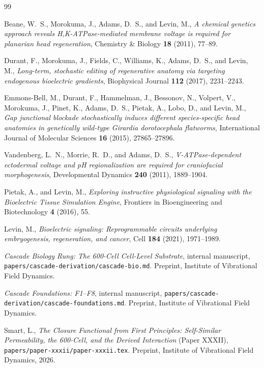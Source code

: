 \documentclass[12pt]{article}
\begin{document}
\begin{thebibliography}{99}

Beane, W.~S., Morokuma, J., Adams, D.~S., and Levin, M.,
\emph{A chemical genetics approach reveals H,K-ATPase-mediated
membrane voltage is required for planarian head regeneration},
Chemistry \& Biology \textbf{18} (2011), 77--89.

Durant, F., Morokuma, J., Fields, C., Williams, K., Adams, D.~S.,
and Levin, M.,
\emph{Long-term, stochastic editing of regenerative anatomy via
targeting endogenous bioelectric gradients},
Biophysical Journal \textbf{112} (2017), 2231--2243.

Emmons-Bell, M., Durant, F., Hammelman, J., Bessonov, N.,
Volpert, V., Morokuma, J., Pinet, K., Adams, D.~S., Pietak, A.,
Lobo, D., and Levin, M.,
\emph{Gap junctional blockade stochastically induces different
species-specific head anatomies in genetically wild-type
Girardia dorotocephala flatworms},
International Journal of Molecular Sciences \textbf{16} (2015),
27865--27896.

Vandenberg, L.~N., Morrie, R.~D., and Adams, D.~S.,
\emph{V-ATPase-dependent ectodermal voltage and pH regionalization
are required for craniofacial morphogenesis},
Developmental Dynamics \textbf{240} (2011), 1889--1904.

Pietak, A., and Levin, M.,
\emph{Exploring instructive physiological signaling with the
Bioelectric Tissue Simulation Engine},
Frontiers in Bioengineering and Biotechnology \textbf{4} (2016), 55.

Levin, M.,
\emph{Bioelectric signaling: Reprogrammable circuits underlying
embryogenesis, regeneration, and cancer},
Cell \textbf{184} (2021), 1971--1989.

\emph{Cascade Biology Rung: The 600-Cell Cell-Level Substrate},
internal manuscript,
\texttt{papers/cascade-derivation/cascade-bio.md}. Preprint,
Institute of Vibrational Field Dynamics.

\emph{Cascade Foundations: F1--F8}, internal manuscript,
\texttt{papers/cascade-derivation/cascade-foundations.md}. Preprint,
Institute of Vibrational Field Dynamics.

Smart, L.,
\emph{The Closure Functional from First Principles: Self-Similar
Permeability, the 600-Cell, and the Derived Interaction}
(Paper XXXII),
\texttt{papers/paper-xxxii/paper-xxxii.tex}. Preprint,
Institute of Vibrational Field Dynamics, 2026.


\end{thebibliography}
\end{document}
